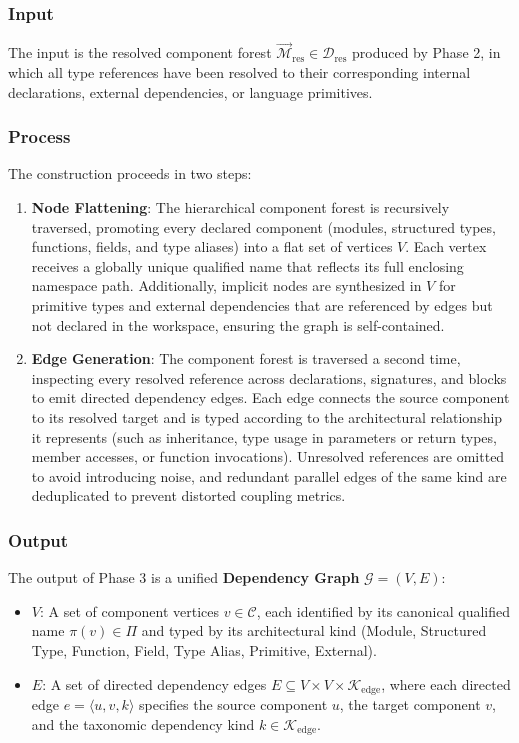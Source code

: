 \subsubsection{Input}

The input is the resolved component forest
$\vec{\mathcal{M}}_{\text{res}} \in \mathcal{D}_{\text{res}}$
produced by Phase 2, in which all type references have been resolved to their
corresponding internal declarations, external dependencies, or
language primitives.

\subsubsection{Process}

The construction proceeds in two steps:

\begin{enumerate}
  \item \textbf{Node Flattening}: The hierarchical component forest is
    recursively traversed, promoting every declared component (modules,
    structured types, functions, fields, and type aliases) into a flat
    set of vertices $V$. Each vertex receives a globally unique
    qualified name that reflects its full enclosing namespace path.
    Additionally, implicit nodes are synthesized in $V$ for primitive types
    and external dependencies that are referenced by edges but not
    declared in the workspace, ensuring the graph is self-contained.
  \item \textbf{Edge Generation}: The component forest is traversed a
    second time, inspecting every resolved reference across declarations,
    signatures, and blocks to emit directed dependency edges.
    Each edge connects the source component to its resolved target
    and is typed according to the architectural relationship it represents
    (such as inheritance, type usage in parameters or return types, member
    accesses, or function invocations). Unresolved references are omitted to
    avoid introducing noise, and redundant parallel edges of the same
    kind are deduplicated to prevent distorted coupling metrics.
\end{enumerate}

\subsubsection{Output}

The output of Phase 3 is a unified \textbf{Dependency Graph}
$\mathcal{G} = (V, E)$:
\begin{itemize}
  \item $V$: A set of component vertices $v \in \mathcal{C}$, each
    identified by its
    canonical qualified name $\pi(v) \in \Pi$ and typed by its
    architectural kind
    (Module, Structured Type, Function, Field, Type Alias, Primitive, External).
  \item $E$: A set of directed dependency edges $E \subseteq V \times
    V \times \mathcal{K}_{\text{edge}}$,
    where each directed edge $e = \langle u, v, k \rangle$ specifies
    the source component $u$,
    the target component $v$, and the taxonomic dependency kind $k
    \in \mathcal{K}_{\text{edge}}$.
\end{itemize}

